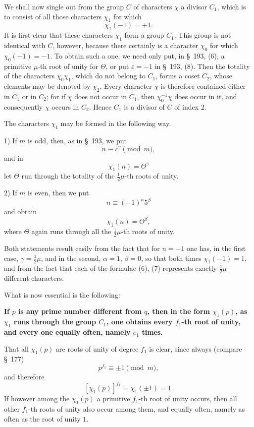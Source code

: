 \documentclass[11pt]{article}
\providecommand{\eps}{\varepsilon}
\providecommand{\eps}{\varepsilon}
\begin{document}
We shall now single out from the group $C$ of characters $\chi$ a divisor $C_1$, which is to consist of all those characters $\chi_1$ for which
\begin{equation}
\chi_1(-1)=+1.
\tag{5}
\end{equation}
It is first clear that these characters $\chi_1$ form a group $C_1$. This group is not identical with $C$, however, because there certainly is a character $\chi_0$ for which $\chi_0(-1)=-1$. To obtain such a one, we need only put, in \S~193, (6), a primitive $\mu$-th root of unity for $\Theta$, or put $\eps=-1$ in \S~193, (8). Then the totality of the characters $\chi_0\chi_1$, which do not belong to $C_1$, forms a coset $C_2$, whose elements may be denoted by $\chi_2$. Every character $\chi$ is therefore contained either in $C_1$ or in $C_2$; for if $\chi$ does not occur in $C_1$, then $\chi_0^{-1}\chi$ does occur in it, and consequently $\chi$ occurs in $C_2$. Hence $C_1$ is a divisor of $C$ of index $2$.

The characters $\chi_1$ may be formed in the following way.

1) If $m$ is odd, then, as in \S~193, we put
\[
n\equiv c^\gamma\pmod m,
\]
and in
\begin{equation}
\chi_1(n)=\Theta^\gamma
\tag{6}
\end{equation}
let $\Theta$ run through the totality of the $\frac12\mu$-th roots of unity.

2) If $m$ is even, then we put
\[
n\equiv (-1)^\alpha5^\beta
\]
and obtain
\begin{equation}
\chi_1(n)=\Theta^\beta,
\tag{7}
\end{equation}
where $\Theta$ again runs through all the $\frac12\mu$-th roots of unity.

Both statements result easily from the fact that for $n=-1$ one has, in the first case, $\gamma=\frac12\mu$, and in the second, $\alpha=1$, $\beta=0$, so that both times $\chi_1(-1)=1$, and from the fact that each of the formulae (6), (7) represents exactly $\frac12\mu$ different characters.

What is now essential is the following:
\begin{center}
\textbf{If $p$ is any prime number different from $q$, then in the form $\chi_1(p)$, as $\chi_1$ runs through the group $C_1$, one obtains every $f_1$-th root of unity, and every one equally often, namely $e_1$ times.}
\end{center}
That all $\chi_1(p)$ are roots of unity of degree $f_1$ is clear, since always (compare \S~177)
\[
p^{f_1}\equiv \pm 1\pmod m,
\]
and therefore
\[
[\chi_1(p)]^{f_1}=\chi_1(\pm1)=1.
\]
If however among the $\chi_1(p)$ a primitive $f_1$-th root of unity occurs, then all other $f_1$-th roots of unity also occur among them, and equally often, namely as often as the root of unity $1$.
\end{document}

